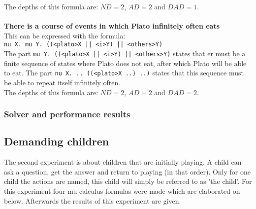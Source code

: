 \documentclass[10pt,a4paper]{article}
\begin{document}
The depths of this formula are: $ND = 2$, $AD = 2$ and $DAD = 1$.
\\\\
\textbf{There is a course of events in which Plato infinitely often eats}\\
This can be expressed with the formula:\\
{\tt nu X. mu Y. ((<plato>X || <i>Y) || <others>Y)}\\
The part {\tt mu Y. ((<plato>X || <i>Y) || <others>Y)} states that er must be a finite sequence of states where Plato does not eat, after which Plato will be able to eat. The part {\tt nu X. .. ((<plato>X ..) ..)} states that this sequence must be able to repeat itself infinitely often.\\
The depths of this formula are: $ND = 2$, $AD = 2$ and $DAD = 2$.



\subsubsection{Solver and performance results}


\subsection{Demanding children}
The second experiment is about children that are initially playing. A child can ask a question, get the answer and return to playing (in that order). Only for one child the actions are named, this child will simply be referred to as 'the child'. For this experiment four mu-calculus formulas were made which are elaborated on below. Afterwards the results of this experiment are given.
\end{document}

